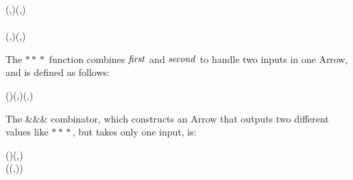 \documentclass[paper=A4,twoside=true,openright,parskip=full,chapterprefix=true,headings=normal,bibliography=totoc,listof=totoc,titlepage=on,captions=tableabove,draft=false,british]{scrreprt}%
\begin{document}
\begin{hscode}\SaveRestoreHook
{}%
%
%
\>[B]{}\mathbin{::}\;\Rightarrow {}\;\;\to {}\;(,)\;(,){}\<[E]%
\\
\>[B]{}\;\mathrel{=}\;\mathbin{>\!\!>\!\!>}\;\mathbin{>\!\!>\!\!>}\;\<[E]%
\\
\>[B]{}\<[5]%
\>[5]{}\;\;(,)\mathrel{=}(,){}\<[E]%
\ColumnHook
\end{hscode}\resethooks
\vspace{-2\baselineskip}

The \ensuremath{\mathbin{*\!*\!*}} function combines \ensuremath{\Varid{first}} and \ensuremath{\Varid{second}} to handle two inputs in
one Arrow, and is defined as follows:


\begin{hscode}\SaveRestoreHook
{}%
%
\>[B]{}(\mathbin{*\!*\!*})\mathbin{::}\;\Rightarrow {}\;\;\to {}\;\;\to {}\;(,)\;(,){}\<[E]%
\\
\>[B]{}\mathbin{*\!*\!*}\mathrel{=}\;\mathbin{>\!\!>\!\!>}\;\<[E]%
\ColumnHook
\end{hscode}\resethooks
\vspace{-2\baselineskip}

The \ensuremath{\mathbin{\&\!\&\!\&}} combinator, which constructs an Arrow that outputs two
different values like \ensuremath{\mathbin{*\!*\!*}}, but takes only one input, is:


\begin{hscode}\SaveRestoreHook
{}%
%
\>[B]{}(\mathbin{\&\!\&\!\&})\mathbin{::}\;\Rightarrow {}\;\;\to {}\;\;\to {}\;\;(,){}\<[E]%
\\
\>[B]{}\mathbin{\&\!\&\!\&}\mathrel{=}\;(\lambda {}\to (,))\mathbin{>\!\!>\!\!>}\mathbin{*\!*\!*}\<[E]%
\ColumnHook
\end{hscode}\resethooks
\vspace{-2\baselineskip}
\end{document}
